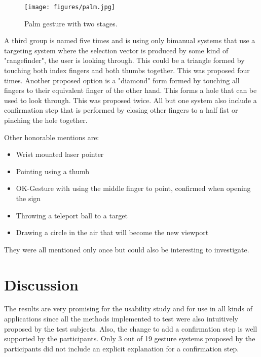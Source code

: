 \begin{figure}[!ht]
    \centering
    \texttt{[image: figures/palm.jpg]}
    \caption{Palm gesture with two stages.}
    \label{fig:palm2}
\end{figure}

A third group is named five times and is using only bimanual systems that use a targeting system where the selection vector is produced by some kind of "rangefinder", the user is looking through. This could be a triangle formed by touching both index fingers and both thumbs together. This was proposed four times. Another proposed option is a "diamond" form formed by touching all fingers to their equivalent finger of the other hand. This forms a hole that can be used to look through. This was proposed twice. All but one system also include a confirmation step that is performed by closing other fingers to a half fist or pinching the hole together.

Other honorable mentions are:
\begin{itemize}
    \item Wrist mounted laser pointer
    \item Pointing using a thumb
    \item OK-Gesture with using the middle finger to point, confirmed when opening the sign
    \item Throwing a teleport ball to a target
    \item Drawing a circle in the air that will become the new viewport
\end{itemize}

They were all mentioned only once but could also be interesting to investigate.

\section{Discussion}
The results are very promising for the usability study and for use in all kinds of applications since all the methods implemented to test were also intuitively proposed by the test subjects. Also, the change to add a confirmation step is well supported by the participants. Only 3 out of 19 gesture systems proposed by the participants did not include an explicit explanation for a confirmation step. 
